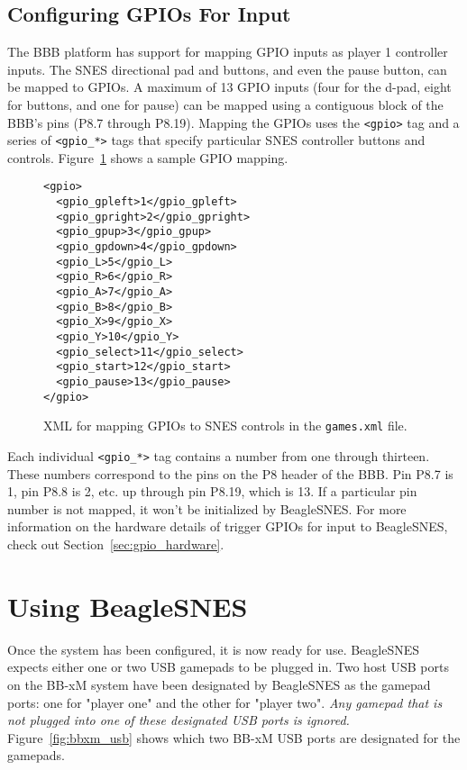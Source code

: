 \subsection{Configuring GPIOs For Input}\label{sec:config_gpio}

The BBB platform has support for mapping GPIO inputs as player 1 controller inputs.  The SNES directional pad and buttons, and even the pause button, can be mapped to GPIOs.  A maximum of 13 GPIO inputs (four for the d-pad, eight for buttons, and one for pause) can be mapped using a contiguous block of the BBB's pins (P8.7 through P8.19). Mapping the GPIOs uses the \texttt{<gpio>} tag and a series of \texttt{<gpio\_*>} tags that specify particular SNES controller buttons and controls. Figure~\ref{fig:gpio_mapping} shows a sample GPIO mapping.

\begin{figure}[h]
\begin{verbatim}
<gpio>
  <gpio_gpleft>1</gpio_gpleft>
  <gpio_gpright>2</gpio_gpright>
  <gpio_gpup>3</gpio_gpup>
  <gpio_gpdown>4</gpio_gpdown>
  <gpio_L>5</gpio_L>
  <gpio_R>6</gpio_R>
  <gpio_A>7</gpio_A>
  <gpio_B>8</gpio_B>
  <gpio_X>9</gpio_X>
  <gpio_Y>10</gpio_Y>
  <gpio_select>11</gpio_select>
  <gpio_start>12</gpio_start>
  <gpio_pause>13</gpio_pause>
</gpio>\end{verbatim}
\caption{XML for mapping GPIOs to SNES controls in the \texttt{games.xml} file.}\label{fig:gpio_mapping}
\end{figure} 
 
Each individual \texttt{<gpio\_*>} tag contains a number from one through thirteen.  These numbers correspond to the pins on the P8 header of the BBB.  Pin P8.7 is 1, pin P8.8 is 2, etc. up through pin P8.19, which is 13.  If a particular pin number is not mapped, it won't be initialized by BeagleSNES.  For more information on the hardware details of trigger GPIOs for input to BeagleSNES, check out Section~\ref{sec:gpio_hardware}.

\section{Using BeagleSNES}

Once the system has been configured, it is now ready for use. BeagleSNES expects either one or two USB gamepads to be plugged in.  Two host USB ports on the BB-xM system have been designated by BeagleSNES as the gamepad ports: one for "player one" and the other for "player two".  \emph{Any gamepad that is not plugged into one of these designated USB ports is ignored.} Figure~\ref{fig:bbxm_usb} shows which two BB-xM USB ports are designated for the gamepads. 

